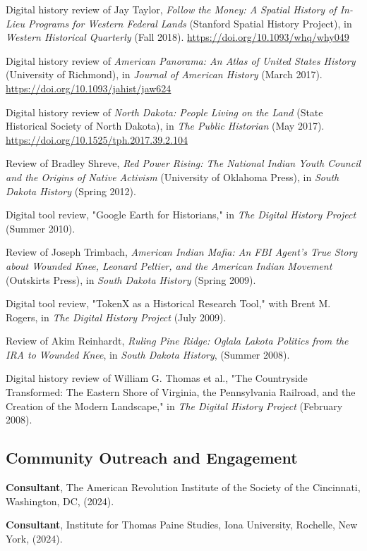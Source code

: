 \documentclass[10pt]{article}
\begin{document}
Digital history review of Jay Taylor, \textit{Follow the Money: A Spatial History of In-Lieu Programs for Western Federal Lands} (Stanford Spatial History Project), in \textit{Western Historical Quarterly} (Fall 2018). \url{https://doi.org/10.1093/whq/why049}

Digital history review of \textit{American Panorama: An Atlas of United States History} (University of Richmond), in \textit{Journal of American History} (March 2017). \url{https://doi.org/10.1093/jahist/jaw624}

Digital history review of \textit{North Dakota: People Living on the Land} (State Historical Society of North Dakota), in \textit{The Public Historian} (May 2017). \url{https://doi.org/10.1525/tph.2017.39.2.104}

Review of Bradley Shreve, \textit{Red Power Rising: The National Indian Youth Council and the Origins of Native Activism} (University of Oklahoma Press), in \textit{South Dakota History} (Spring 2012).

Digital tool review, "Google Earth for Historians," in \textit{The Digital History Project} (Summer 2010).

Review of Joseph Trimbach, \textit{American Indian Mafia: An FBI Agent's True Story about Wounded Knee, Leonard Peltier, and the American Indian Movement} (Outskirts Press), in \textit{South Dakota History} (Spring 2009).

Digital tool review, "TokenX as a Historical Research Tool," with Brent M. Rogers, in \textit{The Digital History Project} (July 2009).

Review of Akim Reinhardt, \textit{Ruling Pine Ridge: Oglala Lakota Politics from the IRA to Wounded Knee}, in \textit{South Dakota History}, (Summer 2008).

Digital history review of William G. Thomas et al., "The Countryside Transformed: The Eastern Shore of Virginia, the Pennsylvania Railroad, and the Creation of the Modern Landscape," in \textit{The Digital History Project} (February 2008).

\subsection{Community Outreach and Engagement}

\textbf{Consultant}, The American Revolution Institute of the Society of the Cincinnati, Washington, DC, (2024).

\textbf{Consultant}, Institute for Thomas Paine Studies, Iona University, Rochelle, New York, (2024). 
\end{document}

